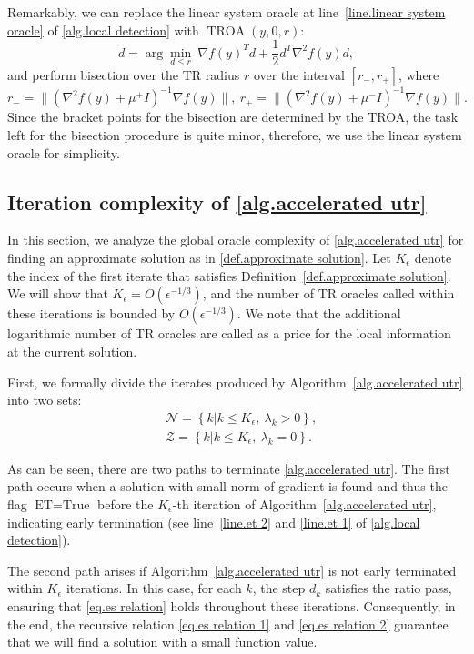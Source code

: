 \documentclass{article}
\begin{document}
Remarkably, we can replace the linear system oracle at line~\ref{line.linear system oracle} of \autoref{alg.local detection} with $\operatorname{TROA}(y,0,r)$:
$$
d = \arg\min_{d\leq r} \ \nabla f(y)^Td+\frac{1}{2}d^T \nabla^2f(y) d,
$$
and perform bisection over the TR radius $r$ over the interval $[r_-,r_+]$, where 
$$
r_- =\|\left(\nabla^2f(y)+\mu^+ I\right)^{-1}\nabla f(y)\|,\ r_+ =\|\left(\nabla ^2f(y)+\mu^- I\right)^{-1}\nabla f(y)\|.
$$
Since the bracket points for the bisection are determined by the TROA, the task left for the bisection procedure is quite minor, therefore, we use the linear system oracle for simplicity.
\subsection{Iteration complexity of \autoref{alg.accelerated utr}}
In this section, we analyze the global oracle complexity of \autoref{alg.accelerated utr} for finding an approximate solution as in \autoref{def.approximate solution}. Let $K_\epsilon$ denote the index of the first iterate that satisfies Definition~\ref{def.approximate solution}. We will show that $K_\epsilon = O(\epsilon^{-1/3})$, and the number of TR oracles called within these iterations is bounded by $\tilde{O}(\epsilon^{-1/3})$. We note that the additional logarithmic number of TR oracles are called as a price for the local information at the current solution.


First, we formally divide the iterates produced by Algorithm~\ref{alg.accelerated utr} into two sets:
\begin{equation}
    \label{eq.outer index catagory}
    \begin{aligned}
         & \mathcal{N} = \left \{ k | k\leq K_\epsilon,\ \lambda_k>0\right\}, \\
         & \mathcal{Z} = \left \{k |k\leq K_\epsilon,\ \lambda_k=0\right\}.
    \end{aligned}
\end{equation}

As can be seen, there are two paths to terminate \autoref{alg.accelerated utr}. The first path occurs when a solution with small norm of gradient is found and thus the flag $\textrm{ET} = \text{True}$ before the $K_\epsilon$-th iteration of Algorithm~\ref{alg.accelerated utr}, indicating early termination (see line~\ref{line.et 2} and \ref{line.et 1} of \autoref{alg.local detection}).

The second path arises if Algorithm~\ref{alg.accelerated utr} is not early terminated within $K_\epsilon$ iterations. In this case, for each $k$, the step $d_k$ satisfies the ratio pass, ensuring that \eqref{eq.es relation} holds throughout these iterations. Consequently, in the end, the recursive relation \eqref{eq.es relation 1} and \eqref{eq.es relation 2} guarantee that we will find a solution with a small function value.
\end{document}
